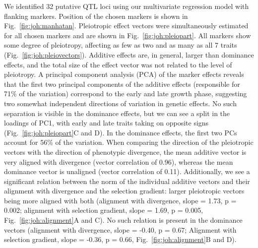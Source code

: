 \begin{refsection}
We identified 32 putative QTL loci using our multivariate regression
model with flanking markers. Position of the chosen markers is shown in
Fig.~\ref{fig:joh:manhatan}. Pleiotropic effect vectors were simultaneously estimated for
all chosen markers and are shown in Fig.~\ref{fig:joh:pleiopart}. All markers show some
degree of pleiotropy, affecting as few as two and as many as all 7
traits (Fig.~\ref{fig:joh:pleiovectors}). Additive effects are, in general, larger than
dominance effects, and the total size of the effect vector was not
related to the level of pleiotropy. A principal component analysis (PCA) of
the marker effects reveals that the first two principal components of
the additive effects (responsible for 71\% of the variation) correspond
to the early and late growth phase, suggesting two somewhat independent
directions of variation in genetic effects. No such separation is
visible in the dominance effects, but we can see a split in the loadings
of PC1, with early and late traits taking on opposite signs (Fig.~\ref{fig:joh:pleiopart}C and
D). In the dominance effects, the first two PCs account for 56\% of the
variation. When comparing the direction of the pleiotropic vectors with
the direction of phenotypic divergence, the mean additive vector is very
aligned with divergence (vector correlation of 0.96), whereas the mean
dominance vector is unaligned (vector correlation of 0.11).
Additionally, we see a significant relation between the norm of the
individual additive vectors and their alignment with divergence and the
selection gradient: larger pleiotropic vectors being more aligned with
both (alignment with divergence, slope = 1.73, p = 0.002; alignment with
selection gradient, slope = 1.69, p = 0.005, Fig.~\ref{fig:joh:alignment}A and C). No such
relation is present in the dominance vectors (alignment with divergence,
slope = -0.40, p = 0.67; Alignment with selection gradient, slope =
-0.36, p = 0.66, Fig.~\ref{fig:joh:alignment}B and D).


\end{refsection}
